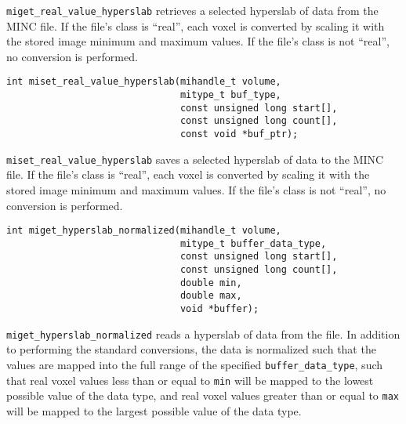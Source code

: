 \documentclass{article}
\begin{document}
{\tt miget\_real\_value\_hyperslab} retrieves a selected hyperslab of
data from the MINC file.  If the file's class is ``real'', each voxel
is converted by scaling it with the stored image minimum and maximum
values.  If the file's class is not ``real'', no conversion is performed.

\begin{verbatim}
int miset_real_value_hyperslab(mihandle_t volume,
                               mitype_t buf_type,
                               const unsigned long start[],
                               const unsigned long count[],
                               const void *buf_ptr);
\end{verbatim}

{\tt miset\_real\_value\_hyperslab} saves a selected hyperslab of data
to the MINC file.  If the file's class is ``real'', each voxel is
converted by scaling it with the stored image minimum and maximum
values.  If the file's class is not ``real'', no conversion is performed.

\begin{verbatim}
int miget_hyperslab_normalized(mihandle_t volume, 
                               mitype_t buffer_data_type,
                               const unsigned long start[], 
                               const unsigned long count[],
                               double min, 
                               double max, 
                               void *buffer);
\end{verbatim}

{\tt miget\_hyperslab\_normalized} reads a hyperslab of data from the file.
In addition to performing the standard conversions, the data is normalized
such that the values are mapped into the full range of the specified 
{\tt buffer\_data\_type}, such that real voxel values less than or equal to 
{\tt min} will be mapped to the lowest possible value of the data type, and
real voxel values greater than or equal to {\tt max} will be mapped to the
largest possible value of the data type.
\end{document}
